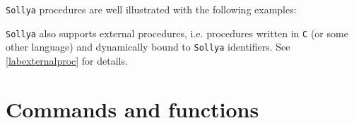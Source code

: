 \documentclass[a4paper]{article}
\newcommand{\sollya}{\texttt{Sollya}\xspace}
\begin{document}
\sollya procedures are well illustrated with the following examples:










\sollya also supports external procedures, i.e. procedures written in
\texttt{C} (or some other language) and dynamically bound to \sollya
identifiers. See \ref{labexternalproc} for details.

\section{Commands and functions}


\end{document}
